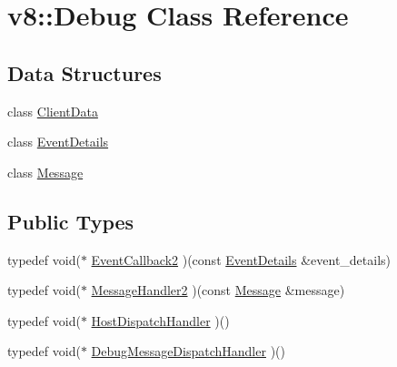 \hypertarget{classv8_1_1Debug}{\section{v8\-:\-:Debug Class Reference}
\label{classv8_1_1Debug}
}
\subsection*{Data Structures}
\begin{DoxyCompactItemize}
\item 
class \hyperlink{classv8_1_1Debug_1_1ClientData}{Client\-Data}
\item 
class \hyperlink{classv8_1_1Debug_1_1EventDetails}{Event\-Details}
\item 
class \hyperlink{classv8_1_1Debug_1_1Message}{Message}
\end{DoxyCompactItemize}
\subsection*{Public Types}
\begin{DoxyCompactItemize}
\item 
typedef void($\ast$ \hyperlink{classv8_1_1Debug_a7c7d64ad935a571c7ee374d8230a1ef7}{Event\-Callback2} )(const \hyperlink{classv8_1_1Debug_1_1EventDetails}{Event\-Details} \&event\-\_\-details)
\item 
typedef void($\ast$ \hyperlink{classv8_1_1Debug_a76bad493edc528bbe9f0924dd54114ca}{Message\-Handler2} )(const \hyperlink{classv8_1_1Debug_1_1Message}{Message} \&message)
\item 
typedef void($\ast$ \hyperlink{classv8_1_1Debug_a93a06401b4d8bbdd09f00ff9125578c3}{Host\-Dispatch\-Handler} )()
\item 
typedef void($\ast$ \hyperlink{classv8_1_1Debug_a0fe6dbc9393500d7e02cc12fae1c7f66}{Debug\-Message\-Dispatch\-Handler} )()
\end{DoxyCompactItemize}
